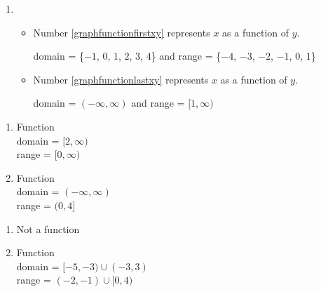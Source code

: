 \documentclass{ximera}
\begin{document}
\begin{enumerate}
\setcounter{enumi}{\value{HW}}

\item  

\begin{itemize}

\item Number \ref{graphfunctionfirstxy} represents $x$ as a function of $y$.

domain  = \{$-1$, $0$, $1$, $2$, $3$, $4$\} and range = \{$-4$, $-3$, $-2$, $-1$, $0$, $1$\}

\item Number \ref{graphfunctionlastxy} represents $x$ as a function of $y$.

domain = $(-\infty, \infty)$  and range = $[1, \infty)$


\end{itemize}

\setcounter{HW}{\value{enumi}}
\end{enumerate}

\begin{multicols}{2}
\begin{enumerate}
\setcounter{enumi}{\value{HW}}

\item Function \\ domain = $[2, \infty)$ \\ range = $[0, \infty)$

\vfill

\columnbreak

\item Function \\ domain = $(-\infty, \infty)$ \\ range = $(0, 4]$

\setcounter{HW}{\value{enumi}}
\end{enumerate}
\end{multicols}


\begin{multicols}{2}
\begin{enumerate}
\setcounter{enumi}{\value{HW}}

\item Not a function


\vfill

\columnbreak

\item Function \\ domain = $[-5,-3) \cup(-3, 3)$ \\ range = $(-2, -1) \cup [0, 4)$

\setcounter{HW}{\value{enumi}}
\end{enumerate}
\end{multicols}
\end{document}
